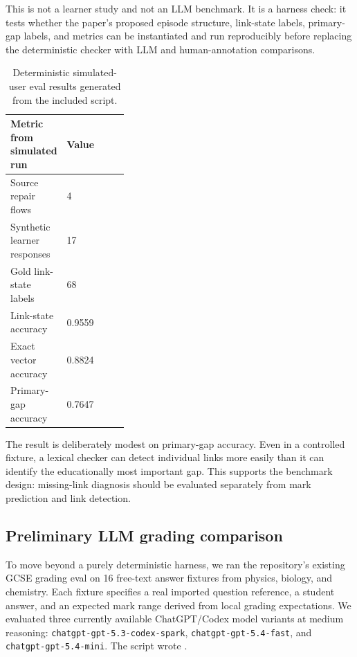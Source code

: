 \documentclass[11pt]{article}
\begin{document}
This is not a learner study and not an LLM benchmark. It is a harness check: it tests whether the paper's proposed episode structure, link-state labels, primary-gap labels, and metrics can be instantiated and run reproducibly before replacing the deterministic checker with LLM and human-annotation comparisons.

\begin{table}[H]
\centering
\small
\begin{tabularx}{\linewidth}{L{0.34\linewidth}Y}
\toprule
\textbf{Metric from simulated run} & \textbf{Value}\\
\midrule
Source repair flows & 4\\
Synthetic learner responses & 17\\
Gold link-state labels & 68\\
Link-state accuracy & 0.9559\\
Exact vector accuracy & 0.8824\\
Primary-gap accuracy & 0.7647\\
\bottomrule
\end{tabularx}
\caption{Deterministic simulated-user eval results generated from the included script.}
\label{tab:simulation}
\end{table}

The result is deliberately modest on primary-gap accuracy. Even in a controlled fixture, a lexical checker can detect individual links more easily than it can identify the educationally most important gap. This supports the benchmark design: missing-link diagnosis should be evaluated separately from mark prediction and link detection.

\subsection{Preliminary LLM grading comparison}

To move beyond a purely deterministic harness, we ran the repository's existing GCSE grading eval on 16 free-text answer fixtures from physics, biology, and chemistry. Each fixture specifies a real imported question reference, a student answer, and an expected mark range derived from local grading expectations. We evaluated three currently available ChatGPT/Codex model variants at medium reasoning: \texttt{chatgpt-gpt-5.3-codex-spark}, \texttt{chatgpt-gpt-5.4-fast}, and \texttt{chatgpt-gpt-5.4-mini}. The script wrote .
\end{document}

